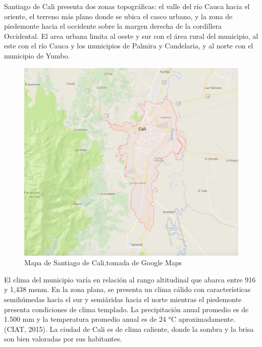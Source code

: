\documentclass[12pt,]{book}
\begin{document}
Santiago de Cali presenta dos zonas topográficas: el valle del río Cauca
hacia el oriente, el terreno más plano donde se ubica el casco urbano, y
la zona de piedemonte hacia el occidente sobre la margen derecha de la
cordillera Occidental. El area urbana limita al oeste y sur con el área
rural del municipio, al este con el río Cauca y los municipios de
Palmira y Candelaria, y al norte con el municipio de Yumbo.

\begin{figure}
\includegraphics[width=1\linewidth]{images/googlemap} \caption{Mapa de Santiago de Cali,tomada de Google Maps}\label{fig:googlemp}
\end{figure}

El clima del municipio varía en relación al rango altitudinal que abarca
entre 916 y 1,438 msnm. En la zona plana, se presenta un clima cálido
con características semihúmedas hacia el sur y semiáridas hacia el norte
mientras el piedemonte presenta condiciones de clima templado. La
precipitación anual promedio es de 1.500 mm y la temperatura promedio
anual es de 24 °C aproximadamente. (CIAT, 2015). La ciudad de Cali es de
clima caliente, donde la sombra y la brisa son bien valoradas por sus
habitantes.
\end{document}
